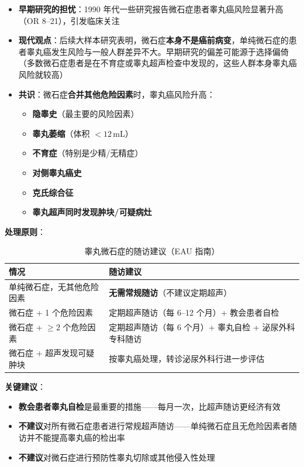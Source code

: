\begin{itemize}[leftmargin=2cm]
	\item \textbf{早期研究的担忧}：1990 年代一些研究报告微石症患者睾丸癌风险显著升高（OR 8--21），引发临床关注
	\item \textbf{现代观点}：后续大样本研究表明，微石症\textbf{本身不是癌前病变}，单纯微石症的患者睾丸癌发生风险与一般人群差异不大。早期研究的偏差可能源于选择偏倚（多数微石症患者是在不育症或睾丸超声检查中发现的，这些人群本身睾丸癌风险就较高）
	\item \textbf{共识}：微石症\textbf{合并其他危险因素}时，睾丸癌风险升高：
	\begin{itemize}
		\item \textbf{隐睾史}（最主要的风险因素）
		\item \textbf{睾丸萎缩}（体积 $<12\,$mL）
		\item \textbf{不育症}（特别是少精/无精症）
		\item \textbf{对侧睾丸癌史}
		\item \textbf{克氏综合征}
		\item \textbf{睾丸超声同时发现肿块/可疑病灶}
	\end{itemize}
\end{itemize}

\vspace{0.5em}
\noindent\textbf{处理原则}：

\begin{table}[htbp]
\centering
\caption{睾丸微石症的随访建议（EAU 指南）}
\label{tab:microlithiasis_followup}
\begin{tabularx}{\textwidth}{@{}lX@{}}
    \toprule
    \textbf{情况} & \textbf{随访建议} \\
    \midrule
    单纯微石症，无其他危险因素 & \textbf{无需常规随访}（不建议定期超声） \\
    微石症 + 1 个危险因素 & 定期超声随访（每 6--12 个月）+ 教会患者自检 \\
    微石症 + $\geq 2$ 个危险因素 & 定期超声随访（每 6 个月）+ 睾丸自检 + 泌尿外科专科随访 \\
    微石症 + 超声发现可疑肿块 & 按睾丸癌处理，转诊泌尿外科行进一步评估 \\
    \bottomrule
\end{tabularx}
\end{table}

\vspace{0.5em}
\noindent\textbf{关键建议}：
\begin{itemize}[leftmargin=2cm]
	\item \textbf{教会患者睾丸自检}是最重要的措施——每月一次，比超声随访更经济有效
	\item \textbf{不建议}对所有微石症患者进行常规超声随访——单纯微石症且无危险因素者随访并不能提高睾丸癌的检出率
	\item \textbf{不建议}对微石症进行预防性睾丸切除或其他侵入性处理
\end{itemize}


